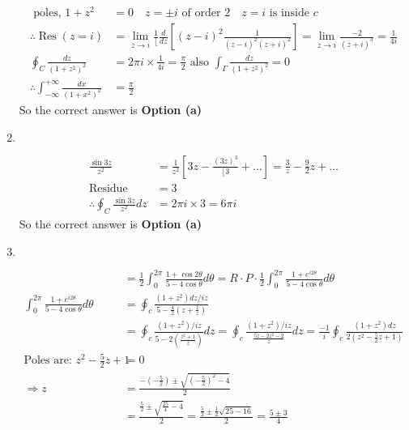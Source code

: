 \begin{enumerate}
\begin{answer}
\begin{align*}
	\text{	poles, }1+z^{2}&=0 \quad z=\pm i\text{ of order $2 \quad z=i$ is inside } c\\
	\therefore \operatorname{Res}(z=i)&=\lim _{z \rightarrow i} \frac{1}{\lfloor} \frac{d}{d z}\left[(z-i)^{2} \frac{1}{(z-i)^{2}(z+i)^{2}}\right]=\lim _{z \rightarrow i} \frac{-2}{(z+i)^{3}}=\frac{1}{4 i}\\
	\oint_{C} \frac{d z}{\left(1+z^{2}\right)^{2}}&=2 \pi i \times \frac{1}{4 i}=\frac{\pi}{2}\text{ also }\int_{\Gamma} \frac{d z}{\left(1+z^{2}\right)^{2}}=0\\
	\therefore \int_{-\infty}^{+\infty} \frac{d x}{\left(1+x^{2}\right)^{2}}&=\frac{\pi}{2}
		\end{align*}
			So the correct answer is \textbf{Option (a)}
	\end{answer}
		\item $\left. \right. $
	\begin{answer}
		\begin{align*}
		\frac{\sin 3 z}{z^{2}}&=\frac{1}{z^{2}}\left[3 z-\frac{(3 z)^{3}}{\lfloor 3}+\ldots\right]=\frac{3}{z}-\frac{9}{2} z+\ldots\\
		\text{Residue }&=3\\
		\therefore \oint_{C} \frac{\sin 3 z}{z^{2}} d z&=2 \pi i \times 3=6 \pi i
		\end{align*}
		So the correct answer is \textbf{Option (a)}
	\end{answer}
	\item $\left. \right. $
	\begin{answer}
		\begin{align*}
		&=\frac{1}{2} \int_{0}^{2 \pi} \frac{1+\cos 2 \theta}{5-4 \cos \theta} d \theta=R \cdot P \cdot \frac{1}{2} \int_{0}^{2 \pi} \frac{1+e^{i 2 \theta}}{5-4 \cos \theta} d \theta\\
		\int_{0}^{2 \pi} \frac{1+e^{i 2 \theta}}{5-4 \cos \theta} d \theta&=\oint_{c} \frac{\left(1+z^{2}\right) d z / i z}{5-\frac{4}{2}\left(z+\frac{1}{z}\right)}\\
		&=\oint_{c} \frac{\left(1+z^{2}\right) / i z}{5-2\left(\frac{z^{2}+1}{z}\right)} d z=\oint_{c} \frac{\left(1+z^{2}\right) / i z}{\frac{5 z-2 z^{2}-2}{z}} d z=\frac{-1}{i} \oint_{c} \frac{\left(1+z^{2}\right) d z}{2\left(z^{2}-\frac{5}{2} z+1\right)}\\
		\text{Poles are: }z^{2}-\frac{5}{2} z+1&=0\\
		\Rightarrow z&=\frac{-\left(-\frac{5}{2}\right) \pm \sqrt{\left(-\frac{5}{2}\right)^{2}-4}}{2}\\
		&=\frac{\frac{5}{2} \pm \sqrt{\frac{25}{4}-4}}{2}=\frac{\frac{5}{2} \pm \frac{1}{2} \sqrt{25-16}}{2}=\frac{5 \pm 3}{4}\\

\end{align*}
\end{answer}
\end{enumerate}

